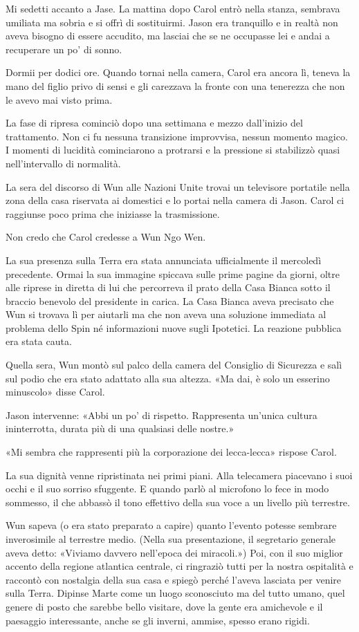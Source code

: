 Mi sedetti accanto a Jase. La mattina dopo Carol entrò nella stanza,
sembrava umiliata ma sobria e si offrì di sostituirmi. Jason era
tranquillo e in realtà non aveva bisogno di essere accudito, ma lasciai
che se ne occupasse lei e andai a recuperare un po' di sonno.

Dormii per dodici ore. Quando tornai nella camera, Carol era ancora lì,
teneva la mano del figlio privo di sensi e gli carezzava la fronte con
una tenerezza che non le avevo mai visto prima.

\separatorefiori

La fase di ripresa cominciò dopo una settimana e mezzo dall'inizio del
trattamento. Non ci fu nessuna transizione improvvisa, nessun momento
magico. I momenti di lucidità cominciarono a protrarsi e la pressione si
stabilizzò quasi nell'intervallo di normalità.

La sera del discorso di Wun alle Nazioni Unite trovai un televisore
portatile nella zona della casa riservata ai domestici e lo portai nella
camera di Jason. Carol ci raggiunse poco prima che iniziasse la
trasmissione.

Non credo che Carol credesse a Wun Ngo Wen.

La sua presenza sulla Terra era stata annunciata ufficialmente il
mercoledì precedente. Ormai la sua immagine spiccava sulle prime pagine
da giorni, oltre alle riprese in diretta di lui che percorreva il prato
della Casa Bianca sotto il braccio benevolo del presidente in carica. La
Casa Bianca aveva precisato che Wun si trovava lì per aiutarli ma che
non aveva una soluzione immediata al problema dello Spin né informazioni
nuove sugli Ipotetici. La reazione pubblica era stata cauta.

Quella sera, Wun montò sul palco della camera del Consiglio di Sicurezza
e salì sul podio che era stato adattato alla sua altezza. «Ma dai, è
solo un esserino minuscolo» disse Carol.

Jason intervenne: «Abbi un po' di rispetto. Rappresenta un'unica cultura
ininterrotta, durata più di una qualsiasi delle nostre.»

«Mi sembra che rappresenti più la corporazione dei lecca-lecca» rispose
Carol.

La sua dignità venne ripristinata nei primi piani. Alla telecamera
piacevano i suoi occhi e il suo sorriso sfuggente. E quando parlò al
microfono lo fece in modo sommesso, il che abbassò il tono effettivo
della sua voce a un livello più terrestre.

Wun sapeva (o era stato preparato a capire) quanto l'evento potesse
sembrare inverosimile al terrestre medio. (Nella sua presentazione, il
segretario generale aveva detto: «Viviamo davvero nell'epoca dei
miracoli.») Poi, con il suo miglior accento della regione atlantica
centrale, ci ringraziò tutti per la nostra ospitalità e raccontò con
nostalgia della sua casa e spiegò perché l'aveva lasciata per venire
sulla Terra. Dipinse Marte come un luogo sconosciuto ma del tutto umano,
quel genere di posto che sarebbe bello visitare, dove la gente era
amichevole e il paesaggio interessante, anche se gli inverni, ammise,
spesso erano rigidi.

